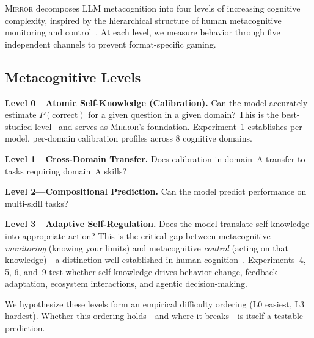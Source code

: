 \documentclass[10pt]{article}
\newcommand{\mirror}{\textsc{Mirror}}
\begin{document}
\mirror{} decomposes LLM metacognition into four levels of increasing cognitive
complexity, inspired by the hierarchical structure of human metacognitive monitoring
and control~\citep{flavell1979metacognition, nelson1990metamemory}. At each level,
we measure behavior through five independent channels to prevent format-specific
gaming.

\subsection{Metacognitive Levels}

\textbf{Level 0---Atomic Self-Knowledge (Calibration).}
Can the model accurately estimate $P(\text{correct})$ for a given question in a
given domain? This is the best-studied level~\citep{kadavath2022language,
kapoor2024calibration} and serves as \mirror{}'s foundation. Experiment~1
establishes per-model, per-domain calibration profiles across 8 cognitive domains.

\textbf{Level 1---Cross-Domain Transfer.}
Does calibration in domain~A transfer to tasks requiring domain~A skills?

\textbf{Level 2---Compositional Prediction.}
Can the model predict performance on multi-skill tasks?

\textbf{Level 3---Adaptive Self-Regulation.}
Does the model translate self-knowledge into appropriate action? This is the
critical gap between metacognitive \textit{monitoring} (knowing your limits) and
metacognitive \textit{control} (acting on that knowledge)---a distinction
well-established in human cognition~\citep{metcalfe2008metacognitive}.
Experiments~4, 5, 6, and~9 test whether self-knowledge drives behavior change,
feedback adaptation, ecosystem interactions, and agentic decision-making.

We hypothesize these levels form an empirical difficulty ordering (L0 easiest, L3
hardest). Whether this ordering holds---and where it breaks---is itself a testable
prediction.
\end{document}
